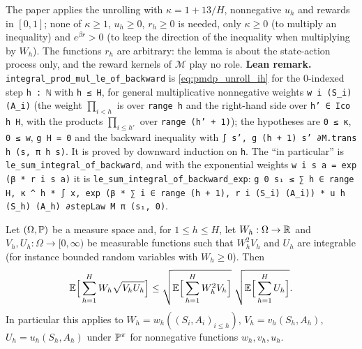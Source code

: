 \begin{remark}[Hypotheses]\label{rem:pmdp_unroll_hypotheses}
The paper applies the unrolling with $\kappa = 1 + 13/H$, nonnegative $u_h$ and rewards in
$[0, 1]$; none of $\kappa \ge 1$, $u_h \ge 0$, $r_h \ge 0$ is needed, only $\kappa \ge 0$ (to
multiply an inequality) and $e^{\beta r} > 0$ (to keep the direction of the inequality when
multiplying by $W_h$). The functions $r_h$ are arbitrary: the lemma is about the state-action
process only, and the reward kernels of $\mathcal M$ play no role. \textbf{Lean remark.}
\texttt{integral\_prod\_mul\_le\_of\_backward} is \eqref{eq:pmdp_unroll_ih} for the $0$-indexed
step \texttt{h : ℕ} with \texttt{h ≤ H}, for general multiplicative nonnegative weights
\texttt{w i (S\_i) (A\_i)} (the weight $\prod_{i < h}$ is over \texttt{range h} and the right-hand
side over \texttt{h' ∈ Ico h H}, with the products $\prod_{i \le h'}$ over \texttt{range (h' + 1)}); the
hypotheses are \texttt{0 ≤ κ}, \texttt{0 ≤ w}, \texttt{g H = 0} and the backward inequality with
\texttt{∫ s', g (h + 1) s' ∂M.trans h (s, π h s)}. It is proved by downward induction on
\texttt{h}. The ``in particular'' is \texttt{le\_sum\_integral\_of\_backward}, and with the
exponential weights \texttt{w i s a = exp (β * r i s a)} it is
\texttt{le\_sum\_integral\_of\_backward\_exp}:
\texttt{g 0 s₁ ≤ ∑ h ∈ range H, κ \^{} h * ∫ x, exp (β * ∑ i ∈ range (h + 1), r i (S\_i) (A\_i)) * u h (S\_h) (A\_h) ∂stepLaw M π (s₁, 0)}.
\end{remark}

\begin{lemma}\label{lem:cauchy_schwarz_traj}
\leanok
Let $(\Omega, \mathbb{P})$ be a measure space and, for $1 \le h \le H$, let
$W_h : \Omega \to \mathbb{R}$ and $V_h, U_h : \Omega \to [0, \infty)$ be measurable functions such that
$W_h^2 V_h$ and $U_h$ are integrable (for instance bounded random variables with $W_h \ge 0$). Then
\[
  \mathbb{E}\Big[\sum_{h = 1}^H W_h\sqrt{V_h U_h}\Big]
  \le \sqrt{\mathbb{E}\Big[\sum_{h=1}^H W_h^2 V_h\Big]}\;\sqrt{\mathbb{E}\Big[\sum_{h=1}^H U_h\Big]} .
\]
In particular this applies to $W_h = w_h((S_i, A_i)_{i \le h})$, $V_h = v_h(S_h, A_h)$,
$U_h = u_h(S_h, A_h)$ under $\mathbb{P}^\pi$ for nonnegative functions $w_h, v_h, u_h$.
\end{lemma}

